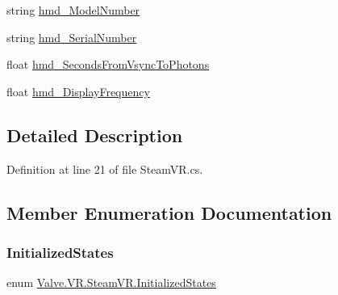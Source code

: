 \begin{DoxyCompactItemize}
\item 
string \mbox{\hyperlink{class_valve_1_1_v_r_1_1_steam_v_r_ada446ef9b5017d9ca6eda9279cfc5d23}{hmd\+\_\+\+Model\+Number}}
\item 
string \mbox{\hyperlink{class_valve_1_1_v_r_1_1_steam_v_r_acd5b6dcff4258d20e8d1554978bb241a}{hmd\+\_\+\+Serial\+Number}}
\item 
float \mbox{\hyperlink{class_valve_1_1_v_r_1_1_steam_v_r_a06b32b2353f1702c09ffdedf137628f9}{hmd\+\_\+\+Seconds\+From\+Vsync\+To\+Photons}}
\item 
float \mbox{\hyperlink{class_valve_1_1_v_r_1_1_steam_v_r_a1fc2e51a5472228e0d09258b96cd35c8}{hmd\+\_\+\+Display\+Frequency}}
\end{DoxyCompactItemize}


\subsection{Detailed Description}


Definition at line 21 of file Steam\+V\+R.\+cs.



\subsection{Member Enumeration Documentation}
\mbox{\label{class_valve_1_1_v_r_1_1_steam_v_r_a09db867d75bbc654801bb318dd85a5e3}} 
\subsubsection{\texorpdfstring{InitializedStates}{InitializedStates}}
{\footnotesize\ttfamily enum \mbox{\hyperlink{class_valve_1_1_v_r_1_1_steam_v_r_a09db867d75bbc654801bb318dd85a5e3}{Valve.\+V\+R.\+Steam\+V\+R.\+Initialized\+States}}\hspace{0.3cm}{\ttfamily [strong]}}

